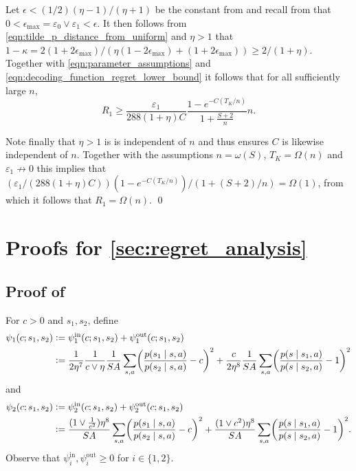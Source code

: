 \documentclass[11pt]{article}
\newcommand{\eqdef}{\vcentcolon=}
\theoremstyle{definition}
\theoremstyle{definition}
\begin{document}
Let $\epsilon<(1/2)(\eta-1)/(\eta+1)$ be the constant from  and recall from  that $0< \epsilon_{\max}=\varepsilon_0\vee\varepsilon_1< \epsilon$.
It then follows from \eqref{eqn:tilde_p_distance_from_uniform} and $\eta>1$ that $1-\kappa = 2(1+2\epsilon_{\max})/(\eta(1-2\epsilon_{\max})+(1+2\epsilon_{\max})) \geq 2/(1+\eta)$.
Together with \eqref{eqn:parameter_assumptions} and \eqref{eqn:decoding_function_regret_lower_bound} it follows that for all sufficiently large $n$,
\begin{equation}
	R_1
	\geq
	\frac{\varepsilon_1}{288(1+\eta) C}\frac{1-e^{-C(T_K/n)}}{1+\frac{S+2}{n}}
	n
	.
\end{equation}

Note finally that $\eta>1$ is is independent of $n$ and thus  ensures $C$ is likewise independent of $n$.
Together with the assumptions $n=\omega(S)$, $T_K=\Omega(n)$ and $\varepsilon_1\not\rightarrow 0$ this implies that $(\varepsilon_1/(288(1+\eta) C))(1-e^{-C(T_K/n)})/(1+(S+2)/n)=\Omega(1)$, from which it follows that $R_1 = \Omega(n)$.
\qed

\section{Proofs for \texorpdfstring{\cref{sec:regret_analysis}}{the regret analysis}}

\subsection{Proof of \texorpdfstring{}{equivalence of assumptions}}
\label{sec:equivalence_of_identifiability_assumptions}

For $c>0$ and $s_1,s_2$, define
\begin{align}
	\psi_1(c;s_1,s_2)
	&
	\eqdef
	\psi_1^{\mathrm{in}}(c;s_1,s_2)
	+
	\psi_1^{\mathrm{out}}(c;s_1,s_2)
	\label{eqn:definition_lower_bound_function}
	\\
	&
	\eqdef
	\frac{1}{2\eta^7}\frac{1}{c\vee \eta}\frac{1}{SA}\sum_{s,a}\biggl(\frac{p(s_1\mid s,a)}{p(s_2\mid s,a)}-c\biggr)^2
	+
	\frac{c}{2\eta^8}\frac{1}{SA}\sum_{s,a}\biggl(
	\frac{p(s\mid s_1,a)}{p(s\mid s_2,a)}-1
	\biggr)^2
	\nonumber
\end{align}
and
\begin{align}
	\label{eqn:definition_upper_bound_function}
	\psi_2(c;s_1,s_2)
	&
	\eqdef
	\psi_2^{\mathrm{in}}(c;s_1,s_2)
	+
	\psi_2^{\mathrm{out}}(c;s_1,s_2)
	\\
	&
	\eqdef
	\frac{(1\vee \frac{1}{c^2})\eta^8}{SA}\sum_{s,a}\biggl(\frac{p(s_1\mid s,a)}{p(s_2\mid s,a)}-c\biggr)^2
	+
	\frac{(1\vee c^2)\eta^8}{SA}\sum_{s,a}\biggl(
	\frac{p(s\mid s_1,a)}{p(s\mid s_2,a)}-1
	\biggr)^2
	.
	\nonumber
\end{align}
Observe that $\psi_i^{\mathrm{in}},\psi_i^{\mathrm{out}}\geq 0$ for $i\in\{1,2\}$.
\end{document}
